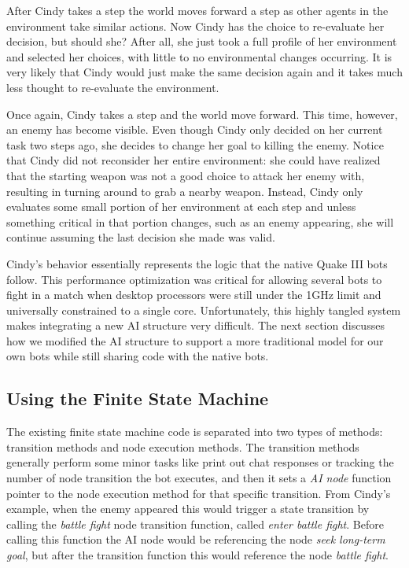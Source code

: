 After Cindy takes a step the world moves forward a step as other agents in the environment take similar actions. Now Cindy has the choice to re-evaluate her decision, but should she? After all, she just took a full profile of her environment and selected her choices, with little to no environmental changes occurring. It is very likely that Cindy would just make the same decision again and it takes much less thought to re-evaluate the environment.

Once again, Cindy takes a step and the world move forward. This time, however, an enemy has become visible. Even though Cindy only decided on her current task two steps ago, she decides to change her goal to killing the enemy. Notice that Cindy did not reconsider her entire environment: she could have realized that the starting weapon was not a good choice to attack her enemy with, resulting in turning around to grab a nearby weapon. Instead, Cindy only evaluates some small portion of her environment at each step and unless something critical in that portion changes, such as an enemy appearing, she will continue assuming the last decision she made was valid.

Cindy's behavior essentially represents the logic that the native Quake III bots follow. This performance optimization was critical for allowing several bots to fight in a match when desktop processors were still under the 1GHz limit and universally constrained to a single core. Unfortunately, this highly tangled system makes integrating a new AI structure very difficult. The next section discusses how we modified the AI structure to support a more traditional model for our own bots while still sharing code with the native bots.

\subsection{Using the Finite State Machine}

The existing finite state machine code is separated into two types of methods: transition methods and node execution methods. The transition methods generally perform some minor tasks like print out chat responses or tracking the number of node transition the bot executes, and then it sets a \emph{AI node} function pointer to the node execution method for that specific transition. From Cindy's example, when the enemy appeared this would trigger a state transition by calling the \emph{battle fight} node transition function, called \emph{enter battle fight}. Before calling this function the AI node would be referencing the node \emph{seek long-term goal}, but after the transition function this would reference the node \emph{battle fight}.

